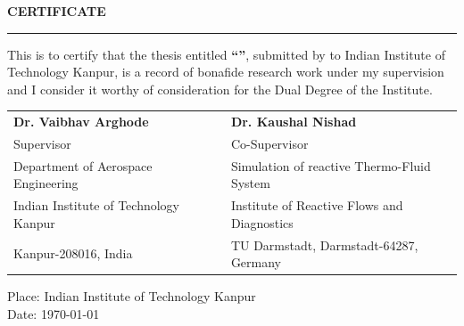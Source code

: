 
\baselineskip
\centerline{\textbf{\Large{CERTIFICATE}}}
\noindent\rule{16cm}{1pt}
\baselineskip

\noindent
This is to certify that the thesis entitled \textbf{\textquotedblleft \thesistitle \textquotedblright}, submitted by \textbf{\authorname} to Indian Institute of Technology Kanpur, is a record of bonafide research work under my supervision and I consider it worthy of consideration for the Dual Degree of the Institute.


\vspace*{1.5cm}


\begin{table}[h]
\begin{tabular}{lp{2.1 cm}l}
\textbf{Dr. Vaibhav Arghode}  						&   &  	\textbf{Dr. Kaushal Nishad}  \\
Supervisor  		&   &  	Co-Supervisor \\
Department of Aerospace Engineering 	&  	& 	Simulation of reactive Thermo-Fluid System \\
Indian Institute of Technology Kanpur 	&   & 	Institute of Reactive Flows and Diagnostics\\
Kanpur-208016, India & & TU Darmstadt, Darmstadt-64287, Germany \\
\end{tabular}
\end{table}

\vspace*{2cm}
\noindent
Place: Indian Institute of Technology Kanpur\\
Date: \today 